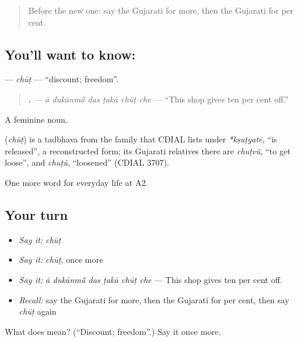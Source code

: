 \label{lesson:GU-C187-chut}



\begin{quote}
Before the new one: say the Gujarati for more, then the Gujarati for per cent.
\end{quote}

\subsection*{You'll want to know: }
\textbf{} — \emph{chūṭ} — \textquotedblleft{}discount; freedom\textquotedblright{}.

\begin{quote}
\textbf{     .} — \emph{ā dukānmā̃ das ṭakā chūṭ che} — \textquotedblleft{}This shop gives ten per cent off.\textquotedblright{}
\end{quote}

A feminine noun.

\begin{cousinweb}
\textbf{} (\emph{chūṭ}) is a tadbhava from the family that CDIAL lists under \emph{*kṣuṭyatē}, \textquotedblleft{}is released\textquotedblright{}, a reconstructed form; its Gujarati relatives there are \emph{chuṭvũ}, \textquotedblleft{}to get loose\textquotedblright{}, and \emph{chuṭũ}, \textquotedblleft{}loosened\textquotedblright{} (CDIAL 3707).
\end{cousinweb}

\begin{grammarlens}[title={What you've built}]
One more word for everyday life at A2.
\end{grammarlens}

\subsection*{Your turn}
\begin{itemize}
\raggedright
  \item \emph{Say it:} \emph{chūṭ}
  \item \emph{Say it:} \emph{chūṭ}, once more
  \item \emph{Say it:} \emph{ā dukānmā̃ das ṭakā chūṭ che} — This shop gives ten per cent off.
  \item \emph{Recall:} say the Gujarati for more, then the Gujarati for per cent, then say \emph{chūṭ} again
\end{itemize}

\begin{tcolorbox}[breakable,colback=teal!4,colframe=teal!35!black,title={Before you move on}]
What does  mean? (\textquotedblleft{}Discount; freedom\textquotedblright{}.) Say it once more.
\end{tcolorbox}
